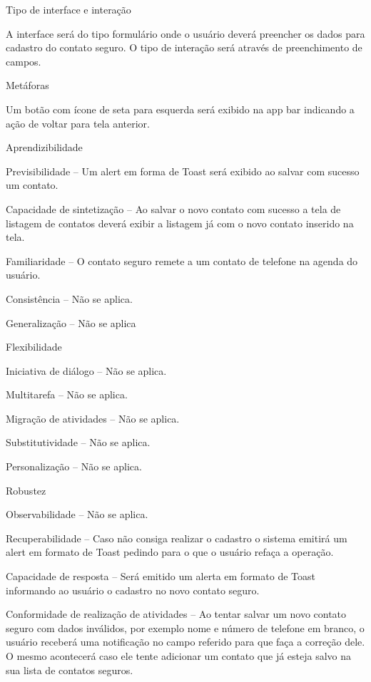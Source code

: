 \begin{alineas}
  \item Tipo de interface e interação
  
A interface será do tipo formulário onde o usuário deverá preencher os dados para cadastro do contato seguro. O tipo de interação será através de preenchimento de campos.
  \item Metáforas
  
Um botão com ícone de seta para esquerda será exibido na app bar indicando a ação de voltar para tela anterior.
  \item Aprendizibilidade
  
Previsibilidade – Um alert em forma de Toast será exibido ao salvar com sucesso um contato.

Capacidade de sintetização – Ao salvar o novo contato com sucesso a tela de listagem de contatos deverá exibir a listagem já com o novo contato inserido na tela. 

Familiaridade – O contato seguro remete a um contato de telefone na agenda do usuário.

Consistência – Não se aplica.

Generalização – Não se aplica
  \item Flexibilidade
  
Iniciativa de diálogo – Não se aplica.

Multitarefa – Não se aplica.

Migração de atividades – Não se aplica.

Substitutividade – Não se aplica.

Personalização – Não se aplica.
  \item Robustez
  
Observabilidade – Não se aplica.

Recuperabilidade – Caso não consiga realizar o cadastro o sistema emitirá um alert em formato de Toast pedindo para o que o usuário refaça a operação.
 
Capacidade de resposta – Será emitido um alerta em formato de Toast informando ao usuário o cadastro no novo contato seguro.

Conformidade de realização de atividades – Ao tentar salvar um novo contato seguro com dados inválidos, por exemplo nome e número de telefone em branco, o usuário receberá uma notificação no campo referido para que faça a correção dele. O mesmo acontecerá caso ele tente adicionar um contato que já esteja salvo na sua lista de contatos seguros. 

\end{alineas}


